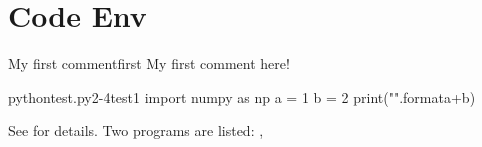 
\section{Code Env}

\begin{frame}[fragile]
  \begin{commentBox}{My first comment}{first}
    My first comment here! \faTree
  \end{commentBox}

  \begin{codeBox}{python}{test.py}{{2-4}}{test1}
    import numpy as np
    a = 1
    b = 2
    print("{}".format{a+b})
  \end{codeBox}

\end{frame}

\begin{frame}
  See  for details. Two programs are listed: , 
\end{frame}
